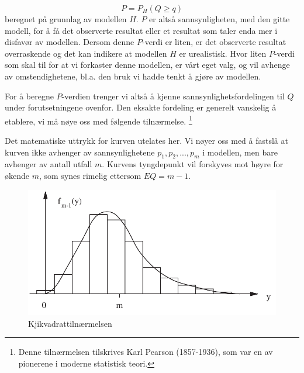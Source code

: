 \[ P=P_H(Q\geq q) \]
beregnet på grunnlag av modellen $H$. $P$ er altså
sannsynligheten, med den gitte modell, for å få det observerte
resultat eller et resultat som taler enda mer i disfavør av
modellen. Dersom denne $P$-verdi er liten, er det observerte
resultat overraskende og det kan indikere at modellen $H$ er
urealistisk. Hvor liten $P$-verdi som skal til for at vi forkaster
denne modellen, er vårt eget valg, og vil avhenge av
omstendighetene, bl.a. den bruk vi hadde tenkt å gjøre av
modellen.

For å beregne $P$-verdien trenger vi altså å kjenne
sannsynlighetsfordelingen til $Q$ under forutsetningene ovenfor.
Den eksakte fordeling er generelt vanskelig å etablere, vi må
nøye oss med følgende tilnærmelse. \footnote{Denne tilnærmelsen
tilskrives Karl Pearson (1857-1936), som var en av pionerene i
moderne statistisk teori.}

\begin{center}  \end{center}

\noindent Det matematiske uttrykk for kurven utelates her. Vi nøyer oss med
å fastslå at kurven ikke avhenger av sannsynlighetene $p_1, p_2,
..., p_m$ i modellen, men bare avhenger av antall utfall $m$.
Kurvens tyngdepunkt vil forskyves mot høyre for økende $m$, som
synes rimelig ettersom $EQ=m-1$.

\begin{figure}[ht]
\centering
   \includegraphics[scale=0.8]{figurer/fig7_6.pdf} 
 \caption{Kjikvadrattilnærmelsen}
	\label{fig:X2approx}
\end{figure}

